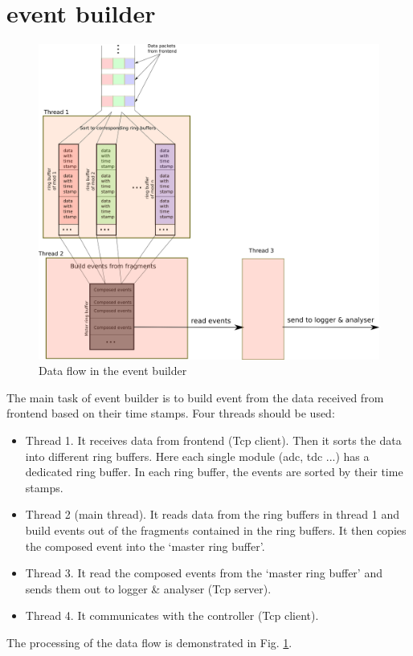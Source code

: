\documentclass[a4paper,12pt]{article}
\begin{document}
	\section{event builder}
	\begin{figure}
		\begin{center}
			\includegraphics[width=.9\textwidth]{figs/data_format.eps}
			\caption{\label{fig03}Data flow in the event builder }
		\end{center}
	\end{figure}
	The main task of event builder is to build event from the data received
	from frontend based on their time stamps. Four threads should be used:
	\begin{itemize}
		\item Thread 1. It receives data from frontend (Tcp client). Then it
			sorts the data into different ring buffers. Here each single
			module (adc, tdc ...) has a dedicated ring buffer. In each ring
			buffer, the events are sorted by their time stamps.
		\item Thread 2 (main thread). It reads data from the ring buffers in
			thread 1 and build events out of the fragments contained in the
			ring buffers. It then copies the composed event into the `master
			ring buffer'.
		\item Thread 3. It read the composed events from the `master ring
			buffer' and sends them out to logger \& analyser (Tcp server).
		\item Thread 4. It communicates with the controller (Tcp client).
	\end{itemize}
	The processing of the data flow is demonstrated in Fig. \ref{fig03}.
\end{document}
